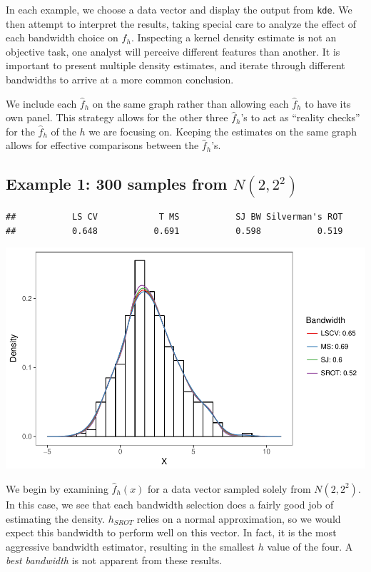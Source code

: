 \documentclass[]{article}
\begin{document}
In each example, we choose a data vector and display the output from
\texttt{kde}. We then attempt to interpret the results, taking special
care to analyze the effect of each bandwidth choice on \(\hat{f}_h\).
Inspecting a kernel density estimate is not an objective task, one
analyst will perceive different features than another. It is important
to present multiple density estimates, and iterate through different
bandwidths to arrive at a more common conclusion.

We include each \(\hat f_h\) on the same graph rather than allowing each
\(\hat f_h\) to have its own panel. This strategy allows for the other
three \(\hat f_h\)'s to act as ``reality checks'' for the \(\hat f_h\)
of the \(h\) we are focusing on. Keeping the estimates on the same graph
allows for effective comparisons between the \(\hat f_h\)'s.

\newpage

\subsection{Example 1: 300 samples from $N(2, 2^2)$}

\begin{verbatim}
##           LS CV            T MS           SJ BW Silverman's ROT 
##           0.648           0.691           0.598           0.519
\end{verbatim}

\begin{center}\includegraphics{FinalReport_files/figure-latex/unnamed-chunk-6-1} \end{center}

We begin by examining \(\widehat{f}_h(x)\) for a data vector sampled
solely from \(N(2, 2^2)\). In this case, we see that each bandwidth
selection does a fairly good job of estimating the density. \(h_{SROT}\)
relies on a normal approximation, so we would expect this bandwidth to
perform well on this vector. In fact, it is the most aggressive
bandwidth estimator, resulting in the smallest \(h\) value of the four.
A \emph{best bandwidth} is not apparent from these results.
\end{document}
